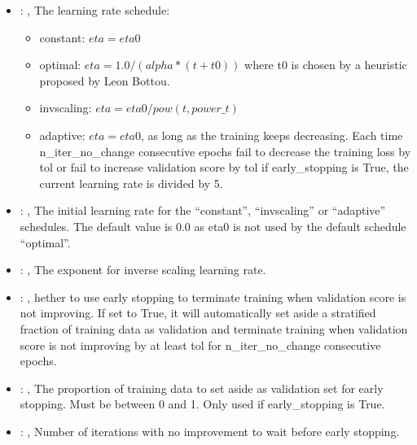 \begin{itemize}
    \item {}: , 
      The learning rate schedule:                                                  \begin{itemize}
      \item constant: $eta = eta0$                                                   \item optimal:
      $eta = 1.0 / (alpha * (t + t0))$ where t0 is chosen by a heuristic proposed by Leon Bottou.
      \item invscaling: $eta = eta0 / pow(t, power\_t)$
      \item adaptive: $eta = eta0$, as long as the training keeps decreasing. Each time
      n\_iter\_no\_change consecutive epochs fail
      to decrease the training loss by tol or fail to increase validation score by tol if
      early\_stopping is True, the current
      learning rate is divided by 5.                                                  \end{itemize}

    \item {}: , 
      The initial learning rate for the ``constant'', ``invscaling'' or ``adaptive'' schedules. The
      default value is 0.0                                                  as eta0 is not used by
      the default schedule ``optimal''.

    \item {}: , 
      The exponent for inverse scaling learning rate.

    \item {}: , 
      hether to use early stopping to terminate training when validation score is not
      improving. If set to True, it will automatically set aside a stratified fraction of training
      data as validation and terminate training when validation score is not improving by at least
      tol for n\_iter\_no\_change consecutive epochs.

    \item {}: , 
      The proportion of training data to set aside as validation set for early stopping.
      Must be between 0 and 1. Only used if early\_stopping is True.

    \item {}: , 
      Number of iterations with no improvement to wait before early stopping.


\end{itemize}
